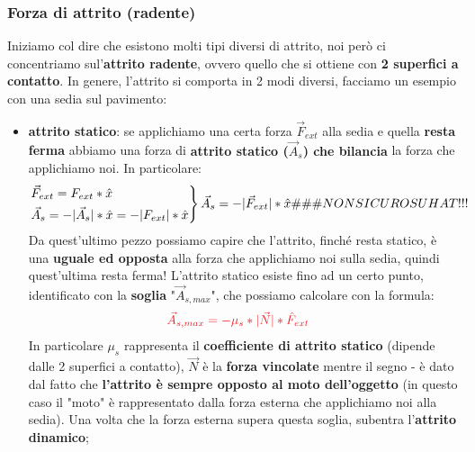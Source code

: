         \subsubsection{Forza di attrito (radente)}
            Iniziamo col dire che esistono molti tipi diversi di attrito, noi però ci concentriamo sul'\textbf{attrito radente}, ovvero quello che si ottiene con \textbf{2 superfici a contatto}. In genere, l'attrito si comporta in 2 modi diversi, facciamo un esempio con una sedia sul pavimento:
            \begin{itemize}
                \item \textbf{attrito statico}: se applichiamo una certa forza $\vec{F}_{ext}$ alla sedia e quella \textbf{resta ferma} abbiamo una forza di \textbf{attrito statico ($\vec{A}_s$) che bilancia} la forza che applichiamo noi. In particolare:
                \begin{align*}
                    \begin{rcases*}
                        \vec{F}_{ext}=F_{ext}*\hat{x}\\
                        \vec{A}_{s}= -|\vec{A}_s|*\hat{x}=-|F_{ext}|*\hat{x}
                    \end{rcases*}
                    \vec{A}_s=-|\vec{F}_{ext}|*\hat{x} \#\#\#NON SICURO SU HAT!!!
                \end{align*}
                Da quest'ultimo pezzo possiamo capire che l'attrito, finché resta statico, è una \textbf{uguale ed opposta} alla forza che applichiamo noi sulla sedia, quindi quest'ultima resta ferma!
                L'attrito statico esiste fino ad un certo punto, identificato con la \textbf{soglia} "$\vec{A}_{s, max}$", che possiamo calcolare con la formula:
                \begin{align*}
                    &\textcolor{Red}{\vec{A}_{s, max} = -\mu_s*|\vec{N}|*\hat{F}_{ext}}
                \end{align*}
                In particolare $\mu_s$ rappresenta il \textbf{coefficiente di attrito statico} (dipende dalle 2 superfici a contatto), $\vec{N}$ è la \textbf{forza vincolate} mentre il segno - è dato dal fatto che \textbf{l'attrito è sempre opposto al moto dell'oggetto} (in questo caso il "moto" è rappresentato dalla forza esterna che applichiamo noi alla sedia). Una volta che la forza esterna supera questa soglia, subentra l'\textbf{attrito dinamico};


\end{itemize}
